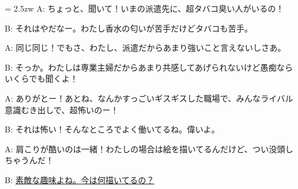 \documentclass[11pt]{amsart}
\title{}
\author{}
\newenvironment{hangall}[1]{\hangindent = 2.5zw\everypar{\hangindent = 2.5zw}}{}
\begin{document}
\maketitle
\begin{hangall}{}%
A: ちょっと、聞いて！いまの派遣先に、超タバコ臭い人がいるの！

B: それはやだなー。わたし香水の匂いが苦手だけどタバコも苦手。

A: 同じ同じ！でもさ、わたし、派遣だからあまり強いこと言えないしさあ。

B: そっか。わたしは専業主婦だからあまり共感してあげられないけど愚痴ならいくらでも聞くよ！

A: ありがとー！あとね、なんかすっごいギスギスした職場で、みんなライバル意識むき出しで、超怖いのー！

B: それは怖い！そんなところでよく働いてるね。偉いよ。

A: 肩こりが酷いのは一緒！わたしの場合は絵を描いてるんだけど、つい没頭しちゃうんだ！

B: \ul{素敵な趣味よね。今は何描いてるの？}\end{hangall}
\end{document}
